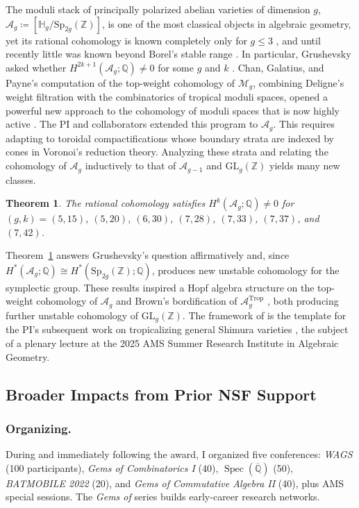\documentclass[11pt,reqno]{amsart}
\newtheorem{theorem}[lemma]{Theorem}
\theoremstyle{remark}
\newcommand{\Spec}{\operatorname{Spec}}
\newcommand{\HH}{\mathbb{H}}
\newcommand{\QQ}{\mathbb{Q}}
\newcommand{\ZZ}{\mathbb{Z}}
\newcommand{\cA}{\mathcal{A}}
\newcommand{\cM}{\mathcal{M}}
\DeclareMathOperator{\trop}{Trop}
\begin{document}
The moduli stack of principally polarized abelian varieties of dimension $g$, $\cA_g\coloneqq[\HH_g/\mathrm{Sp}_{2g}(\ZZ)]$, is one of the most classical objects in algebraic geometry, yet its rational cohomology is known completely only for $g\leq 3$ \cite{igusa62,hain02}, and until recently little was known beyond Borel's stable range \cite{borel74}. In particular, Grushevsky asked whether $H^{2k+1}(\cA_{g};\QQ)\neq0$ for some $g$ and $k$ \cite{grushevsky09}. Chan, Galatius, and Payne's computation of the top-weight cohomology of $\cM_g$, combining Deligne's weight filtration with the combinatorics of tropical moduli spaces, opened a powerful new approach to the cohomology of moduli spaces \cite{CGP21} that is now highly active \cite{CGP22,payneWillwacher21,BCGY23,canningLarsonPayne23}. The PI and collaborators extended this program to $\cA_g$. This requires adapting \cite{CGP21} to toroidal compactifications whose boundary strata are indexed by cones in Voronoi's reduction theory. Analyzing these strata and relating the cohomology of $\cA_g$ inductively to that of $\cA_{g-1}$ and $\mathrm{GL}_g(\ZZ)$ yields many new classes.

\begin{theorem}\cite[Thm.~A]{BBCMMW24}\label{thm:Ag}
The rational cohomology satisfies $H^{k}(\cA_{g};\QQ)\neq0$ for $(g,k)=(5,15)$, $(5,20)$, $(6,30)$, $(7,28)$, $(7,33)$, $(7,37)$, and $(7,42)$.
\end{theorem}

Theorem~\ref{thm:Ag} answers Grushevsky's question affirmatively and, since $H^*(\cA_g;\QQ) \cong H^*(\mathrm{Sp}_{2g}(\ZZ);\QQ)$, produces new unstable cohomology for the symplectic group. These results inspired a Hopf algebra structure on the top-weight cohomology of $\cA_{g}$ \cite{BCGP24} and Brown's bordification of $\cA_g^{\trop}$ \cite{Brown23}, both producing further unstable cohomology of $\mathrm{GL}_g(\ZZ)$. The framework of \cite{BBCMMW24} is the template for the PI's subsequent work on tropicalizing general Shimura varieties \cite{ABBCV25,ABBCV26}, the subject of a plenary lecture at the 2025 AMS Summer Research Institute in Algebraic Geometry.

\subsection{Broader Impacts from Prior NSF Support}\label{subsec:prior-broader-impacts}

\subsubsection{Organizing.} During and immediately following the award, I organized five conferences: \textit{WAGS} (100 participants), \textit{Gems of Combinatorics I} (40), $\Spec(\overline{\QQ})$ (50), \textit{BATMOBILE 2022} (20), and \textit{Gems of Commutative Algebra II} (40), plus AMS special sessions. The \textit{Gems of} series builds early-career research networks.
\end{document}
